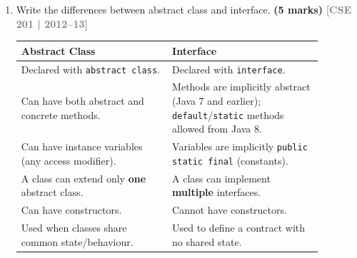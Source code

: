 \documentclass[12pt,a3paper]{article}
\newcommand{\yr}[1]{\hfill\textcolor{gray}{\small\textbf{[#1]}}}
\newcommand{\mk}[1]{\textcolor{orange!70!black}{\small\textbf{(#1 marks)}}}
\begin{document}
\begin{enumerate}
\begin{tcolorbox}
\begin{lstlisting}[language=Java]
// Class implementing the interface
class Circle implements Shape {
    double radius;

    Circle(double r) { radius = r; }

    @Override
    public double area() { return Math.PI * radius * radius; }

    @Override
    public double perimeter() { return 2 * Math.PI * radius; }
}

// Main class
public class Main {
    public static void main(String[] args) {

        // Method 1: object via concrete class reference
        Circle c = new Circle(5.0);
        System.out.println("Area: " + c.area());

        // Method 2: object via interface reference (polymorphism)
        Shape s = new Circle(7.0);
        System.out.println("Perimeter: " + s.perimeter());
    }
}
\end{lstlisting}

\textbf{Key point:} An interface reference (\texttt{Shape s}) can hold any
object whose class implements \texttt{Shape}.  Only the methods declared
in the interface are accessible through \texttt{s}.

\end{tcolorbox}

\item Write the differences between abstract class and interface. \mk{5}
\yr{CSE 201 | 2012--13}

\begin{tcolorbox}[enhanced,breakable,ansbox,
  colback=cD!4,colframe=cD,boxrule=0.8pt,arc=5pt,
  title={\textbf{Answer --- Abstract Class vs.\ Interface}},
  fonttitle=\bfseries\color{white},colbacktitle=cD]

\begin{center}
\small
\begin{tabular}{@{}p{0.44\linewidth}p{0.44\linewidth}@{}}
\toprule
\textbf{Abstract Class} & \textbf{Interface} \\
\midrule
Declared with \texttt{abstract class}. &
Declared with \texttt{interface}. \\[4pt]
Can have both abstract and concrete methods. &
Methods are implicitly abstract (Java 7 and earlier);
\texttt{default}/\texttt{static} methods allowed from Java 8. \\[4pt]
Can have instance variables (any access modifier). &
Variables are implicitly \texttt{public static final} (constants). \\[4pt]
A class can extend only \textbf{one} abstract class. &
A class can implement \textbf{multiple} interfaces. \\[4pt]
Can have constructors. &
Cannot have constructors. \\[4pt]
Used when classes share common state/behaviour. &
Used to define a contract with no shared state. \\
\bottomrule
\end{tabular}
\end{center}


\end{tcolorbox}
\end{enumerate}
\end{document}
